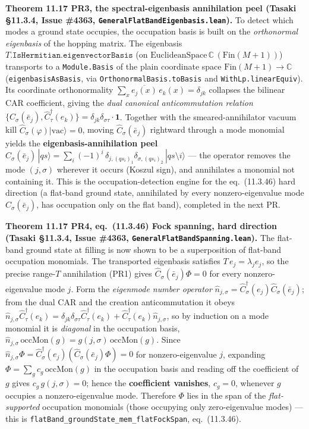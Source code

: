 \documentclass[a4paper,11pt]{article}
\begin{document}
\medskip\noindent\textbf{Theorem 11.17 PR3, the spectral-eigenbasis annihilation peel (Tasaki
§11.3.4, Issue \#4363, \texttt{GeneralFlatBandEigenbasis.lean}).}  To detect which modes a ground
state occupies, the occupation basis is built on the \emph{orthonormal eigenbasis} of the hopping
matrix.  The eigenbasis $T.\mathtt{IsHermitian.eigenvectorBasis}$ (on
$\mathrm{EuclideanSpace}\,\mathbb C\,(\mathrm{Fin}(M{+}1))$) transports to a \texttt{Module.Basis}
of the plain coordinate space $\mathrm{Fin}(M{+}1)\to\mathbb C$ (\texttt{eigenbasisAsBasis}, via
\texttt{OrthonormalBasis.toBasis} and \texttt{WithLp.linearEquiv}).  Its coordinate orthonormality
$\sum_x \overline{e_j(x)}\,e_k(x)=\delta_{jk}$ collapses the bilinear CAR coefficient, giving the
\emph{dual canonical anticommutation relation}
$\{\hat C_\sigma(\bar e_j),\hat C^\dagger_\tau(e_k)\}=\delta_{jk}\delta_{\sigma\tau}\cdot\mathbf 1$.
Together with the smeared-annihilator vacuum kill $\hat C_\sigma(\varphi)|\mathrm{vac}\rangle=0$,
moving $\hat C_\sigma(\bar e_j)$ rightward through a mode monomial yields the
\textbf{eigenbasis-annihilation peel}
$\hat C_\sigma(\bar e_j)\,|qs\rangle = \sum_i (-1)^i\,\delta_{j,(qs_i)_1}\delta_{\sigma,(qs_i)_2}\,
|qs\setminus i\rangle$ — the operator removes the mode $(j,\sigma)$ wherever it occurs (Koszul
sign), and annihilates a monomial not containing it.  This is the occupation-detection engine for
the eq.~(11.3.46) hard direction (a flat-band ground state, annihilated by every nonzero-eigenvalue
mode $\hat C_\sigma(\bar e_j)$, has occupation only on the flat band), completed in the next PR.

\medskip\noindent\textbf{Theorem 11.17 PR4, eq.~(11.3.46) Fock spanning, hard direction (Tasaki
§11.3.4, Issue \#4363, \texttt{GeneralFlatBandSpanning.lean}).}  The flat-band ground state at
filling is now shown to be a superposition of flat-band occupation monomials.  The transported
eigenbasis satisfies $T\,e_j=\lambda_j e_j$, so the precise range-$T$ annihilation (PR1) gives
$\hat C_\sigma(\bar e_j)\Phi=0$ for every nonzero-eigenvalue mode $j$.  Form the \emph{eigenmode
number operator} $\hat n_{j,\sigma}=\hat C^\dagger_\sigma(e_j)\hat C_\sigma(\bar e_j)$; from the dual
CAR and the creation anticommutation it obeys
$\hat n_{j,\sigma}\hat C^\dagger_\tau(e_k)=\delta_{jk}\delta_{\sigma\tau}\hat C^\dagger_\tau(e_k)
+\hat C^\dagger_\tau(e_k)\hat n_{j,\sigma}$, so by induction on a mode monomial it is
\emph{diagonal} in the occupation basis, $\hat n_{j,\sigma}\,\mathrm{occMon}(g)=g(j,\sigma)\,
\mathrm{occMon}(g)$.  Since $\hat n_{j,\sigma}\Phi=\hat C^\dagger_\sigma(e_j)(\hat C_\sigma(\bar
e_j)\Phi)=0$ for nonzero-eigenvalue $j$, expanding $\Phi=\sum_g c_g\,\mathrm{occMon}(g)$ in the
occupation basis and reading off the coefficient of $g$ gives $c_g\,g(j,\sigma)=0$; hence the
\textbf{coefficient vanishes}, $c_g=0$, whenever $g$ occupies a nonzero-eigenvalue mode.  Therefore
$\Phi$ lies in the span of the \emph{flat-supported} occupation monomials (those occupying only
zero-eigenvalue modes) --- this is \texttt{flatBand\_groundState\_mem\_flatFockSpan}, eq.~(11.3.46).
\end{document}
